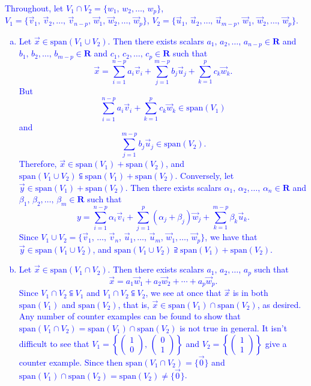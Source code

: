 \documentclass[a4paper,11pt]{article}
\newcommand{\R}{\mathbf{R}}
\newcommand{\BB}[1]{\textcolor{blue}{#1}}
\begin{document}
\BB{
  Throughout, let $V_1 \cap V_2 = \{w_1,\,w_2,\dots,\,w_p\}$,
  $V_1=\{\vec v_1,\,\vec v_2,\dots,\,\vec v_{n-p},\,\vec w_1,\,\vec
  w_2,\dots,\,\vec w_p\}$, $V_2=\{\vec u_1,\,\vec u_2,\dots,\,\vec
  u_{m-p},\,\vec w_1,\,\vec w_2,\dots,\,\vec w_p\}$.
  \begin{enumerate}[(a)]
  \item Let $\vec x \in \text{span}(V_1 \cup V_2)$. Then there exists scalars
    $a_1,\,a_2,\dots,\,a_{n-p} \in \R$ and $b_1,\,b_2,\dots,\,b_{m-p} \in \R$
    and $c_1,\,c_2,\dots,\,c_p \in \R$ such that 
    \[
      \vec x = \sum_{i=1}^{n-p}a_i\vec v_i + \sum_{j=1}^{m-p}b_j\vec u_j +
      \sum_{k=1}^pc_k\vec w_k.
    \]
    But
    \[
      \sum_{i=1}^{n-p}a_i\vec v_i + \sum_{k=1}^pc_k\vec w_k \in \text{span}(V_1)
    \]
    and
    \[
      \sum_{j=1}^{m-p}b_j\vec u_j \in \text{span}(V_2).
    \]
    Therefore, $\vec x \in \text{span}(V_1)+\text{span}(V_2)$, and
    $\text{span}(V_1 \cup V_2) \subseteqq \text{span}(V_1)+\text{span}(V_2)$.
    Conversely, let $\vec y \in \text{span}(V_1)+\text{span}(V_2)$. Then there
    exists scalars $\alpha_1,\,\alpha_2,\dots,\,\alpha_n \in \R$ and
    $\beta_1,\,\beta_2,\dots,\,\beta_m \in \R$ such that
    \[
      y = \sum_{i=1}^{n-p}\alpha_i\vec v_i +
      \sum_{j=1}^p(\alpha_j+\beta_j)\vec w_j +
      \sum_{k=1}^{m-p}\beta_k\vec u_k.
    \]
    Since $V_1 \cup V_2=\{\vec v_1,\,\dots,\,\vec v_n,\,\vec u_1,\dots,\,\vec
    u_m,\,\vec w_1,\dots,\,\vec w_p\}$, we have that $\vec y \in \text{span}(V_1
    \cup V_2)$, and $\text{span}(V_1 \cup V_2) \supseteqq
    \text{span}(V_1)+\text{span}(V_2)$.
  \item Let $\vec x \in \text{span}(V_1 \cap V_2)$. Then there exists scalars
    $a_1,\,a_2,\dots,\,a_p$ such that
    \[
      \vec x = a_1\vec w_1 + a_2\vec w_2 + \cdots + a_p\vec w_p.
    \]
    Since $V_1 \cap V_2 \subseteqq V_1$ and $V_1 \cap V_2 \subseteqq V_2$, we
    see at once that $\vec x$ is in both $\text{span}(V_1)$ and
    $\text{span}(V_2)$, that is, $\vec x \in
    \text{span}(V_1)\cap\text{span}(V_2)$, as desired. Any number of counter
    examples can be found to show that $\text{span}(V_1 \cap V_2) =
    \text{span}(V_1) \cap \text{span}(V_2)$ is not true in general. It isn't
    difficult to see that $V_1=\left\{
      \left( \begin{smallmatrix}1\\0\end{smallmatrix}
      \right),\,\left( \begin{smallmatrix}0\\1\end{smallmatrix} \right)
    \right\}$  and $V_2=\left\{
      \left( \begin{smallmatrix}1\\1\end{smallmatrix} \right) \right\}$ give
    a counter example. Since then $\text{span}(V_1 \cap V_2)=\{\vec 0\}$ and
    $\text{span}(V_1)\cap\text{span}(V_2)=\text{span}(V_2) \neq \{\vec 0\}$. \\
  \end{enumerate}}
\end{document}
